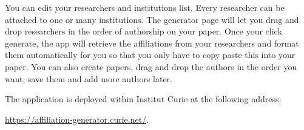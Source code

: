 You can edit your researchers and institutions list. Every researcher can be attached to one or many institutions. The generator page will let you drag and drop researchers in the order of authorship on your paper. Once your click generate, the app will retrieve the affiliations from your researchers and format them automatically for you so that you only have to copy paste this into your paper. You can also create papers, drag and drop the authors in the order you want, save them and add more authors later.

The application is deployed within Institut Curie at the following address:

\url{https://affiliation-generator.curie.net/}.
